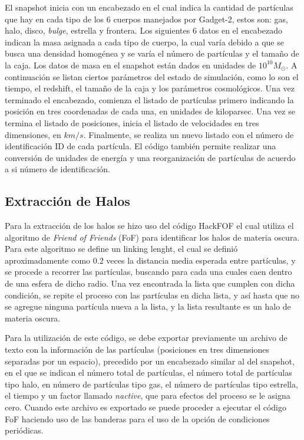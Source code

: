 El snapshot inicia con un encabezado en el cual indica la cantidad de partículas que hay en cada tipo de los 6 cuerpos manejados por Gadget-2, estos son: gas, halo, disco, \textit{bulge}, estrella y frontera. Los siguientes 6 datos en el encabezado indican la masa asignada a cada tipo de cuerpo, la cual varía debido a que se busca una densidad homogénea y se varía el número de partículas y el tamaño de la caja. Los datos de masa en el snapshot están dados en unidades de $10^{10}M_{\odot}$. A continuación se listan ciertos parámetros del estado de simulación, como lo son el tiempo, el redshift, el tamaño de la caja y los parámetros cosmológicos. Una vez terminado el encabezado, comienza el listado de partículas primero indicando la posición en tres coordenadas de cada una, en unidades de kiloparsec. Una vez se termina el listado de posiciones, inicia el listado de velocidades en tres dimensiones, en $km/s$. Finalmente, se realiza un nuevo listado con el número de identificación ID de cada partícula. El código también permite realizar una conversión de unidades de energía y una reorganización de partículas de acuerdo a si número de identificación.

\subsection{Extracción de Halos}
Para la extracción de los halos se hizo uso del código HackFOF el cual utiliza el algoritmo de \textit{Friend of Friends} (FoF) para identificar los halos de materia oscura. Para este algoritmo se define un linking lenght, el cual se definió aproximadamente como $0.2$ veces la distancia media esperada entre partículas, y se procede a recorrer las partículas, buscando para cada una cuales caen dentro de una esfera de dicho radio. Una vez encontrada la lista que cumplen con dicha condición, se repite el proceso con las partículas en dicha lista, y así hasta que no se agregue ninguna partícula nueva a la lista, y la lista resultante es un halo de materia oscura. 

Para la utilización de este código, se debe exportar previamente un archivo de texto con la información de las partículas (posiciones en tres dimensiones separadas por un espacio), precedido por un encabezado similar al del snapshot, en el que se indican el número total de partículas, el número total de partículas tipo halo, en número de partículas tipo gas, el número de partículas tipo estrella, el tiempo y un factor llamado \textit{nactive}, que para efectos del proceso se le asigna cero. Cuando este archivo es exportado se puede proceder a ejecutar el código FoF haciendo uso de las banderas para el uso de la opción de condiciones periódicas. 

